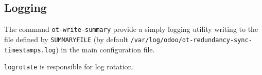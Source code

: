 \documentclass[a4paper]{article}
\begin{document}
\subsection{Logging}
	
	The command \texttt{ot-write-summary} provide a simply logging utility writing to the file defined by \texttt{SUMMARYFILE} (by default \texttt{/var/log/odoo/ot-redundancy-sync-timestamps.log}) in the main configuration file.
	
	\texttt{logrotate} is responsible for log rotation.






\end{document}
